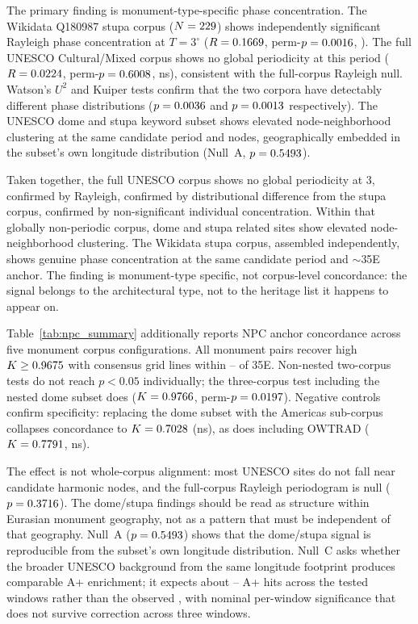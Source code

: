 The primary finding is monument-type-specific phase concentration. The
Wikidata Q180987 stupa corpus ($N=229{}$) shows independently
significant Rayleigh phase concentration at $T=3^\circ$
($R=0.1669{}$, perm-$p=0.0016{}$,
\circConcStupaPSig{}). The full UNESCO Cultural/Mixed corpus shows no
global periodicity at this period ($R=0.0224{}$,
perm-$p=0.6008{}$, ns), consistent with the full-corpus
Rayleigh null. Watson's $U^2$ and Kuiper tests confirm that the two
corpora have detectably different phase distributions
($p=0.0036{}$ and $p=0.0013{}$
respectively). The UNESCO dome and stupa keyword subset shows elevated
node-neighborhood clustering at the same candidate period and nodes,
geographically embedded in the subset's own longitude distribution
(Null~A, $p=0.5493$).

Taken together, the full UNESCO corpus shows no global periodicity at
3\textdegree{}, confirmed by Rayleigh, confirmed by distributional
difference from the stupa corpus, confirmed by non-significant
individual concentration. Within that globally non-periodic corpus,
dome and stupa related sites show elevated node-neighborhood
clustering. The Wikidata stupa corpus, assembled independently, shows
genuine phase concentration at the same candidate period and 
$\sim$35\textdegree{}E anchor. The finding is monument-type specific,
not corpus-level concordance: the signal belongs to the architectural
type, not to the heritage list it happens to appear on.

Table~\ref{tab:npc_summary} additionally reports NPC anchor
concordance across five monument corpus configurations. All monument
pairs recover high $K \geq 0.9675{}$ with consensus grid
lines within \npcDomeStupaGridDeltaE\textdegree{}--\npcTwoGridDeltaE\textdegree{}
of 35\textdegree{}E. Non-nested two-corpus tests do not reach $p<0.05$
individually; the three-corpus test including the nested dome subset
does ($K=0.9766{}$, perm-$p=0.0197{}$). Negative controls
confirm specificity: replacing the dome subset with the Americas
sub-corpus collapses concordance to $K=0.7028{}$ (ns), as does
including OWTRAD ($K=0.7791{}$, ns).

The effect is not whole-corpus alignment: most UNESCO sites do not
fall near candidate harmonic nodes, and the full-corpus Rayleigh
periodogram is null ($p=0.3716$).
The dome/stupa findings should be read as structure within Eurasian
monument geography, not as a pattern that must be independent of that
geography. Null~A ($p=0.5493$) shows that the dome/stupa
signal is reproducible from the subset's own longitude distribution.
Null~C asks whether the broader UNESCO background from the same
longitude footprint produces comparable A+ enrichment; it expects
about \geoNullDomeRestrictedMeantwo{}--\geoNullDomeRestrictedMeanten{}
A+ hits across the tested windows rather than the observed
\NcircTierAp{}, with nominal per-window significance that does not
survive correction across three windows.

